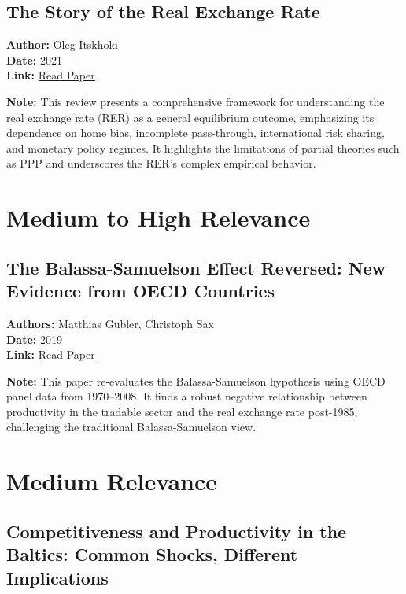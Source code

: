 \documentclass[
  11pt,
]{article}
\begin{document}
\subsection{The Story of the Real Exchange
Rate}\label{the-story-of-the-real-exchange-rate}

\textbf{Author:} Oleg Itskhoki\\
\textbf{Date:} 2021\\
\textbf{Link:}
\href{https://drive.google.com/file/d/1vhVbum9po2xoiaPT8suUqOqjDg5o8EkI/view?usp=sharing}{Read
Paper}

\textbf{Note:} This review presents a comprehensive framework for
understanding the real exchange rate (RER) as a general equilibrium
outcome, emphasizing its dependence on home bias, incomplete
pass-through, international risk sharing, and monetary policy regimes.
It highlights the limitations of partial theories such as PPP and
underscores the RER's complex empirical behavior.

\section{Medium to High Relevance}\label{medium-to-high-relevance}

\subsection{The Balassa-Samuelson Effect Reversed: New Evidence from
OECD
Countries}\label{the-balassa-samuelson-effect-reversed-new-evidence-from-oecd-countries}

\textbf{Authors:} Matthias Gubler, Christoph Sax\\
\textbf{Date:} 2019\\
\textbf{Link:}
\href{https://drive.google.com/file/d/17D8FzoOwr9Z-TulNWzoSWobEIz4HaWuQ/view?usp=sharing}{Read
Paper}

\textbf{Note:} This paper re-evaluates the Balassa-Samuelson hypothesis
using OECD panel data from 1970--2008. It finds a robust negative
relationship between productivity in the tradable sector and the real
exchange rate post-1985, challenging the traditional Balassa-Samuelson
view.

\section{Medium Relevance}\label{medium-relevance}

\subsection{Competitiveness and Productivity in the Baltics: Common
Shocks, Different
Implications}\label{competitiveness-and-productivity-in-the-baltics-common-shocks-different-implications}
\end{document}
